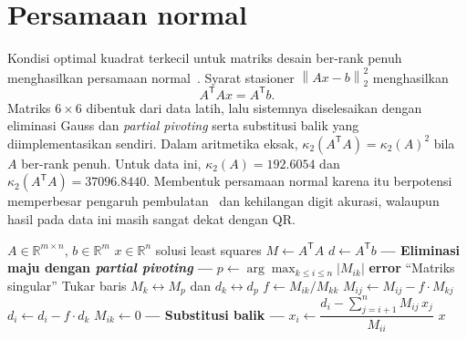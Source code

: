 \documentclass[11pt,a4paper]{article}
\newcommand{\R}{\mathbb{R}}
\newcommand{\norm}[1]{\left\lVert #1\right\rVert_2}
\numberwithin{equation}{section}
\begin{document}
\section{Persamaan normal}
Kondisi optimal kuadrat terkecil untuk matriks desain ber-rank penuh menghasilkan persamaan normal~\cite{trefethen}. Syarat stasioner $\norm{Ax-b}^{2}$ menghasilkan
\begin{equation}
A^\mathsf{T}Ax=A^\mathsf{T}b.
\end{equation}
Matriks $6\times6$ dibentuk dari data latih, lalu sistemnya diselesaikan dengan eliminasi Gauss dan \emph{partial pivoting} serta substitusi balik yang diimplementasikan sendiri. Dalam aritmetika eksak, $\kappa_2(A^\mathsf{T}A)=\kappa_2(A)^2$ bila $A$ ber-rank penuh. Untuk data ini, $\kappa_2(A)=192.6054$ dan $\kappa_2(A^\mathsf{T}A)=37096.8440$. Membentuk persamaan normal karena itu berpotensi memperbesar pengaruh pembulatan~\cite{higham,trefethen} dan kehilangan digit akurasi, walaupun hasil pada data ini masih sangat dekat dengan QR.

\begin{algorithm}[H]
\caption{Penyelesaian Persamaan Normal via Eliminasi Gauss dengan \emph{Partial Pivoting}}
\begin{algorithmic}[1]
\Require $A\in\R^{m\times n}$, $b\in\R^m$
\Ensure $x\in\R^n$ solusi least squares
\State $M \gets A^\mathsf{T}A$ 
\State $d \gets A^\mathsf{T}b$ 
\Statex \textbf{--- Eliminasi maju dengan \emph{partial pivoting} ---}
    \State $p \gets \arg\max_{k \le i \le n} |M_{ik}|$ 
        \State \textbf{error} ``Matriks singular''
    \EndIf
    \State Tukar baris $M_k \leftrightarrow M_p$ dan $d_k \leftrightarrow d_p$
        \State $f \gets M_{ik} / M_{kk}$
            \State $M_{ij} \gets M_{ij} - f \cdot M_{kj}$
        \EndFor
        \State $d_i \gets d_i - f \cdot d_k$
        \State $M_{ik} \gets 0$
    \EndFor
\EndFor
\Statex \textbf{--- Substitusi balik ---}
    \State $x_i \gets \dfrac{d_i - \sum_{j=i+1}^{n} M_{ij}\, x_j}{M_{ii}}$
\EndFor
\State \Return $x$
\end{algorithmic}
\end{algorithm}
\end{document}

